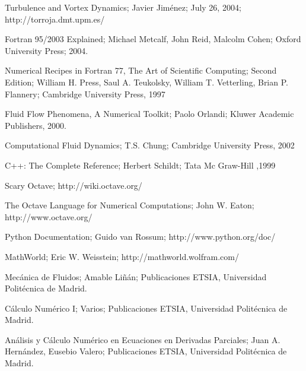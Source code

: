 \documentclass[10pt,fleqn,a4]{book}
\begin{document}
\begin{thebibliography}{99}


  Turbulence and Vortex Dynamics; Javier Jiménez; July 26, 2004;
  http://torroja.dmt.upm.es/


  Fortran 95/2003 Explained; Michael Metcalf, John Reid, Malcolm
  Cohen; Oxford University Press; 2004.


  Numerical Recipes in Fortran 77, The Art of Scientific Computing;
  Second Edition; William H. Press, Saul A. Teukolsky, William T.
  Vetterling, Brian P. Flannery; Cambridge University Press, 1997


  Fluid Flow Phenomena, A Numerical Toolkit; Paolo Orlandi; Kluwer
  Academic Publishers, 2000.


  Computational Fluid Dynamics; T.S. Chung; Cambridge University
  Press, 2002


  C++: The Complete Reference; Herbert Schildt; Tata Mc Graw-Hill
  ,1999


  Scary Octave; http://wiki.octave.org/


  The Octave Language for Numerical Computations; John W. Eaton;
  http://www.octave.org/


  Python Documentation; Guido van Rossum; http://www.python.org/doc/


  MathWorld; Eric W. Weisstein; http://mathworld.wolfram.com/


  Mecánica de Fluidos; Amable Liñán; Publicaciones ETSIA, Universidad
  Politécnica de Madrid.


  Cálculo Numérico I; Varios; Publicaciones ETSIA, Universidad
  Politécnica de Madrid.


  Análisis y Cálculo Numérico en Ecuaciones en Derivadas Parciales;
  Juan A. Hernández, Eusebio Valero; Publicaciones ETSIA, Universidad
  Politécnica de Madrid.


\end{thebibliography}
\end{document}
